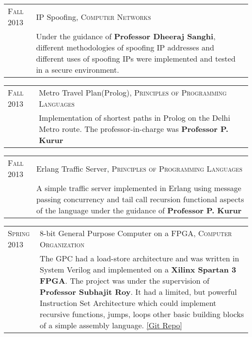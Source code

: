 \documentclass[a4paper,10pt]{article} %
\begin{document}
\begin{tabular}{>{\raggedleft}p{2.2cm}|p{14cm}}
    \textsc{Fall 2013} & IP Spoofing, \textsc{Computer Networks} \\
                       & \footnotesize{Under the guidance of \textbf{Professor Dheeraj Sanghi}, different methodologies
                          of spoofing IP addresses and different uses of spoofing IPs were implemented and tested
                          in a secure environment.}\\
\end{tabular}

\begin{tabular}{>{\raggedleft}p{2.2cm}|p{14cm}}
    \textsc{Fall 2013} & Metro Travel Plan(Prolog), \textsc{Principles of Programming Languages} \\
                       & \footnotesize{Implementation of shortest paths in Prolog on the Delhi Metro route.
                          The professor-in-charge was \textbf{Professor P. Kurur}}\\
\end{tabular}

\begin{tabular}{>{\raggedleft}p{2.2cm}|p{14cm}}
    \textsc{Fall 2013} & Erlang Traffic Server, \textsc{Principles of Programming Languages} \\
                       & \footnotesize{A simple traffic server implemented in Erlang using message passing
                          concurrency and tail call recursion functional aspects of the language under the
                          guidance of \textbf{Professor P. Kurur}}\\
\end{tabular}

\begin{tabular}{>{\raggedleft}p{2.2cm}|p{14cm}}
    \textsc{Spring 2013} & 8-bit General Purpose Computer on a FPGA, \textsc{Computer Organization} \\
                         & \footnotesize{The GPC had a load-store architecture and was written in System Verilog and
                            implemented on a \textbf{Xilinx Spartan 3 FPGA}.  The project was under the
                            supervision of \textbf{Professor Subhajit Roy}.  It had a limited, but powerful
                            Instruction Set Architecture which could implement recursive functions, jumps,
                            loops  other basic building blocks of a simple assembly language.
                            \href{https://github.com/srijanshetty/220_y11} {[Git Repo]}} \\
\end{tabular}
\end{document}
